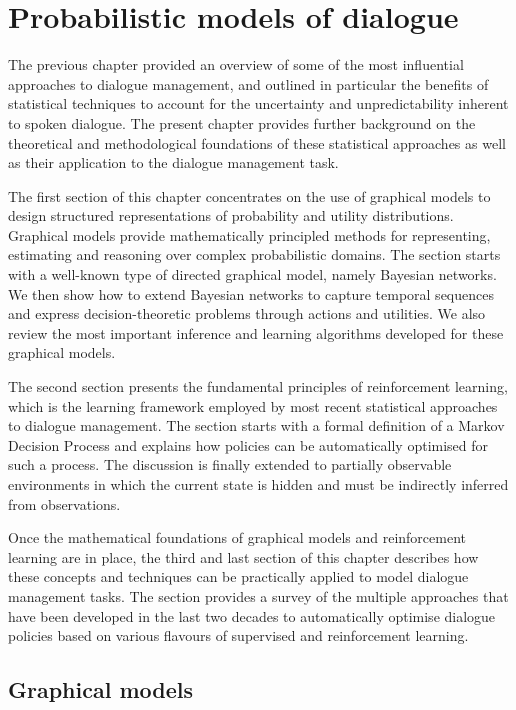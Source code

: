 \chapter{Probabilistic models of dialogue}
\label{chap:probmodelling}

The previous chapter provided an overview of some of the most influential approaches to dialogue management, and outlined in particular the benefits of statistical techniques to account for the uncertainty and unpredictability inherent to spoken dialogue. The present chapter provides further background on the theoretical and methodological foundations of these statistical approaches as well as their application to the dialogue management task. 

The first section of this chapter concentrates on the use of graphical models to design structured representations of probability and utility distributions. Graphical models provide mathematically principled methods for representing, estimating and reasoning over complex probabilistic domains. The section starts with a well-known type of directed graphical model, namely Bayesian networks.  We then show how to extend Bayesian networks to capture temporal sequences and express decision-theoretic problems through actions and utilities. We also review the most important inference and learning algorithms developed for these graphical models.

The second section presents the fundamental principles of reinforcement learning, which is the learning framework employed by most recent statistical approaches to dialogue management. The section starts with a formal definition of a Markov Decision Process and explains how policies can be automatically optimised for such a process.  The discussion is finally extended to partially observable environments in which the current state is hidden and must be indirectly inferred from observations.   

Once the mathematical foundations of graphical models and reinforcement learning are in place, the third and last section of this chapter describes how these concepts and techniques can be practically applied to model dialogue management tasks.  The section provides a survey of the multiple approaches that have been developed in the last two decades to automatically optimise dialogue policies based on various flavours of supervised and reinforcement learning.  

\section{Graphical models}
\label{sec:pgm}

